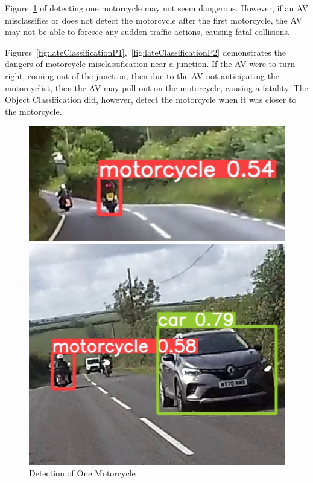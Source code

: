 \documentclass[conference]{IEEEtran}
\begin{document}
    Figure~\ref{fig:detectionOfOneMotorcycle} of detecting one motorcycle may not seem dangerous. However, if an AV misclassifies or does not detect the motorcycle after the first motorcycle, the AV may not be able to foresee any sudden traffic actions, causing fatal collisions.

    Figures~\ref{fig:lateClassificationP1},~\ref{fig:lateClassificationP2} demonstrates the dangers of motorcycle misclassification near a junction. If the AV were to turn right, coming out of the junction, then due to the AV not anticipating the motorcyclist, then the AV may pull out on the motorcycle, causing a fatality. The Object Classification did, however, detect the motorcycle when it was closer to the motorcycle.
	\begin{figure}[h]
		\centering
		\begin{minipage}{0.15\textwidth}
			\centering
			\includegraphics[width=\linewidth]{Figures/fail.png}
			\caption{Detection of One Motorcycle}
			\label{fig:detectionOfOneMotorcycle}
		\end{minipage}\hfill
		\begin{minipage}{0.15\textwidth}
			\centering
			\includegraphics[width=\linewidth]{Figures/left_turn.png}

\end{minipage}
\end{figure}
\end{document}
